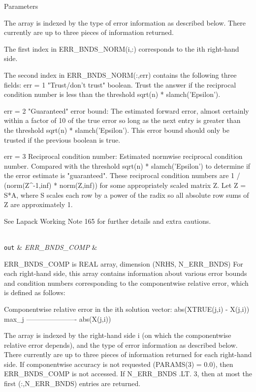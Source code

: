 \begin{DoxyParams}[1]{Parameters}
\begin{DoxyVerb}
     The array is indexed by the type of error information as described
     below. There currently are up to three pieces of information
     returned.

     The first index in ERR_BNDS_NORM(i,:) corresponds to the ith
     right-hand side.

     The second index in ERR_BNDS_NORM(:,err) contains the following
     three fields:
     err = 1 "Trust/don't trust" boolean. Trust the answer if the
              reciprocal condition number is less than the threshold
              sqrt(n) * slamch('Epsilon').

     err = 2 "Guaranteed" error bound: The estimated forward error,
              almost certainly within a factor of 10 of the true error
              so long as the next entry is greater than the threshold
              sqrt(n) * slamch('Epsilon'). This error bound should only
              be trusted if the previous boolean is true.

     err = 3  Reciprocal condition number: Estimated normwise
              reciprocal condition number.  Compared with the threshold
              sqrt(n) * slamch('Epsilon') to determine if the error
              estimate is "guaranteed". These reciprocal condition
              numbers are 1 / (norm(Z^{-1},inf) * norm(Z,inf)) for some
              appropriately scaled matrix Z.
              Let Z = S*A, where S scales each row by a power of the
              radix so all absolute row sums of Z are approximately 1.

     See Lapack Working Note 165 for further details and extra
     cautions.\end{DoxyVerb}
\\
\hline
\mbox{\tt out}  & {\em E\+R\+R\+\_\+\+B\+N\+D\+S\+\_\+\+C\+O\+M\+P} & \begin{DoxyVerb}          ERR_BNDS_COMP is REAL array, dimension (NRHS, N_ERR_BNDS)
     For each right-hand side, this array contains information about
     various error bounds and condition numbers corresponding to the
     componentwise relative error, which is defined as follows:

     Componentwise relative error in the ith solution vector:
                    abs(XTRUE(j,i) - X(j,i))
             max_j ----------------------
                         abs(X(j,i))

     The array is indexed by the right-hand side i (on which the
     componentwise relative error depends), and the type of error
     information as described below. There currently are up to three
     pieces of information returned for each right-hand side. If
     componentwise accuracy is not requested (PARAMS(3) = 0.0), then
     ERR_BNDS_COMP is not accessed.  If N_ERR_BNDS .LT. 3, then at most
     the first (:,N_ERR_BNDS) entries are returned.


\end{DoxyVerb}
\end{DoxyParams}
